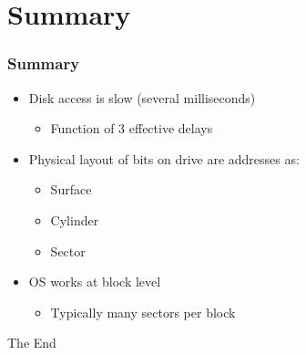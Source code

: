 \documentclass{beamer}
\begin{document}
\section{Summary}
\begin{frame}
\frametitle{Summary}
\begin{itemize}
\item Disk access is slow (several milliseconds)
\begin{itemize}
\item Function of 3 effective delays
\end{itemize}
\item Physical layout of bits on drive are addresses as:
\begin{itemize}
\item Surface
\item Cylinder
\item Sector
\end{itemize}
\item OS works at block level
\begin{itemize}
\item Typically many sectors per block
\end{itemize}
\end{itemize}
\end{frame}

\begin{frame} 
\Huge{\centerline{The End}}
\end{frame}
\end{document}
